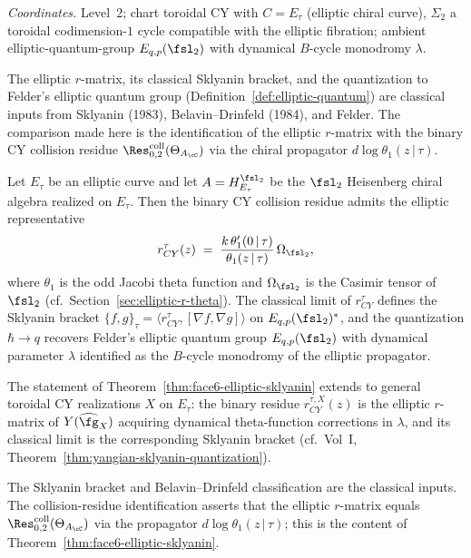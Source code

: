 \smallskip
\noindent\emph{Coordinates.} Level~$2$; chart toroidal CY with
$C = E_\tau$ \textup{(}elliptic chiral curve\textup{)}, $\Sigma_2$ a
toroidal codimension-$1$ cycle compatible with the elliptic
fibration; ambient elliptic-quantum-group $E_{q, p}(\fsl_2)$ with
dynamical $B$-cycle monodromy $\lambda$.

The elliptic $r$-matrix, its classical Sklyanin bracket, and the
quantization to Felder's elliptic quantum group
(Definition~\ref{def:elliptic-quantum}) are classical inputs from
Sklyanin (1983), Belavin--Drinfeld (1984), and Felder. The comparison
made here is the identification of the elliptic $r$-matrix with the
binary CY collision residue
$\Res^{\mathrm{coll}}_{0,2}(\Theta_{A_\cC})$ via the chiral propagator
$d \log \theta_1(z\,|\,\tau)$.

\begin{theorem}
\label{thm:face6-elliptic-sklyanin}
Let $E_\tau$ be an elliptic curve and let $A = H^{\fsl_2}_{E_\tau}$ be
the $\fsl_2$ Heisenberg chiral algebra realized on $E_\tau$. Then the
binary CY collision residue admits the elliptic representative
\[
 r_{CY}^{\tau}(z) \;=\;
 \frac{k\,\theta'_1(0\,|\,\tau)}{\theta_1(z\,|\,\tau)}\,\Omega_{\fsl_2},
\]
where $\theta_1$ is the odd Jacobi theta function and
$\Omega_{\fsl_2}$ is the Casimir tensor of~$\fsl_2$
(cf.\ Section~\ref{sec:elliptic-r-theta}). The classical limit of
$r_{CY}^{\tau}$ defines the Sklyanin bracket
$\{f,g\}_\tau = \langle r_{CY}^{\tau}, [\nabla f, \nabla g]\rangle$ on
$E_{q,p}(\fsl_2)^*$, and the quantization $\hbar \to q$ recovers
Felder's elliptic quantum group $E_{q,p}(\fsl_2)$ with dynamical
parameter $\lambda$ identified as the $B$-cycle monodromy of the
elliptic propagator.
\end{theorem}

\begin{conjecture}
\label{conj:face6-general-toroidal}
\ClaimStatusConjectured
The statement of Theorem~\ref{thm:face6-elliptic-sklyanin} extends to
general toroidal CY realizations $X$ on $E_\tau$: the binary residue
$r_{CY}^{\tau,X}(z)$ is the elliptic $r$-matrix of
$Y(\widehat{\fg}_X)$ acquiring dynamical theta-function corrections in
$\lambda$, and its classical limit is the corresponding Sklyanin
bracket (cf.\ Vol~I,
Theorem~\ref{thm:yangian-sklyanin-quantization}).
\end{conjecture}

\begin{remark}
\label{rem:face6-proof-support}
The Sklyanin bracket and Belavin--Drinfeld classification are the
classical inputs. The collision-residue identification asserts that the
elliptic $r$-matrix equals
$\Res^{\mathrm{coll}}_{0,2}(\Theta_{A_\cC})$ via the propagator
$d\log\theta_1(z\,|\,\tau)$; this is the content of
Theorem~\ref{thm:face6-elliptic-sklyanin}.
\end{remark}

